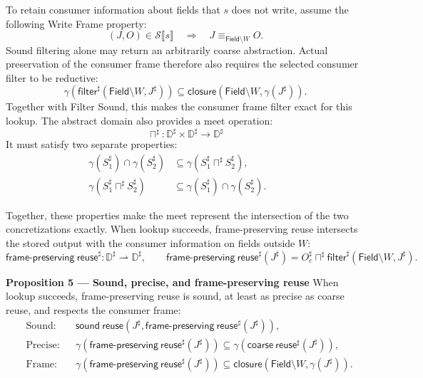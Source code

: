\documentclass[10pt]{article}
\newcommand{\boxheading}[1]{\textbf{#1}\quad}
\newcommand{\Field}{\mathsf{Field}}
\newcommand{\Semantics}[1]{\mathcal S\mathopen{⟦}#1\mathclose{⟧}}
\newcommand{\ProjClose}{\mathsf{closure}}
\newcommand{\filter}{\mathsf{filter}}
\newcommand{\reuse}{\mathsf{coarse\ reuse}}
\newcommand{\frameReuse}{\mathsf{frame\text{-}preserving\ reuse}}
\newcommand{\SoundReuse}{\mathsf{sound\ reuse}}
\newcommand{\agree}[1]{\mathrel{\equiv_{#1}}}
\begin{document}
To retain consumer information about fields that \(s\) does not write, assume the following
Write Frame property:
\[
  (J,O)\in\Semantics{s}
  \quad\Longrightarrow\quad
  J\agree{\Field\setminus W}O.
  \tag{Write Frame}
\]
Sound filtering alone may return an arbitrarily coarse abstraction. Actual preservation of the
consumer frame therefore also requires the selected consumer filter to be reductive:
\[
  \gamma\!\left(\filter^\sharp(\Field\setminus W,J^\sharp)\right)
  \subseteq
  \ProjClose\!\left(\Field\setminus W,\gamma(J^\sharp)\right).
  \tag{Frame Filter Reductive}
\]
Together with Filter Sound, this makes the consumer frame filter exact for this lookup.
The abstract domain also provides a meet operation:
\[
  \sqcap^\sharp:\mathbb D^\sharp\times\mathbb D^\sharp\to\mathbb D^\sharp
\]
It must satisfy two separate properties:
\begin{align*}
  \gamma(S_1^\sharp)\cap\gamma(S_2^\sharp)
  &\subseteq\gamma(S_1^\sharp\sqcap^\sharp S_2^\sharp),
  &&\tag{Meet Sound}\\
  \gamma(S_1^\sharp\sqcap^\sharp S_2^\sharp)
  &\subseteq\gamma(S_1^\sharp)\cap\gamma(S_2^\sharp).
  &&\tag{Meet Reductive}
\end{align*}

Together, these properties make the meet represent the intersection of the two concretizations
exactly. When lookup succeeds, frame-preserving reuse intersects the stored output with the
consumer information on fields outside \(W\):
\[
  \frameReuse^\sharp:\mathbb D^\sharp\rightharpoonup\mathbb D^\sharp,
  \qquad
  \frameReuse^\sharp(J^\sharp)
  =O_c^\sharp\sqcap^\sharp
    \filter^\sharp(\Field\setminus W,J^\sharp).
  \tag{Frame-Preserving Reuse}
\]

\begin{statementbox}
\boxheading{Proposition 5 --- Sound, precise, and frame-preserving reuse}
When lookup succeeds, frame-preserving reuse is sound, at least as precise as coarse reuse, and
respects the consumer frame:
\begin{align*}
  &\text{Sound:}
  &&\SoundReuse\!\left(J^\sharp,\frameReuse^\sharp(J^\sharp)\right),\\
  &\text{Precise:}
  &&\gamma\!\left(\frameReuse^\sharp(J^\sharp)\right)
    \subseteq\gamma\!\left(\reuse^\sharp(J^\sharp)\right),\\
  &\text{Frame:}
  &&\gamma\!\left(\frameReuse^\sharp(J^\sharp)\right)
    \subseteq\ProjClose\!\left(\Field\setminus W,\gamma(J^\sharp)\right).
\end{align*}
\end{statementbox}
\end{document}
